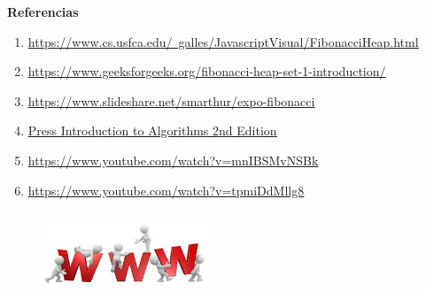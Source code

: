 \documentclass[11pt]{beamer}
\begin{document}
\begin{frame}{\bf \large {}}

{\center \bf \huge \color{red} Referencias \\}

\begin{enumerate}
\item \href{https://www.cs.usfca.edu/~galles/JavascriptVisual/FibonacciHeap.html}{\scriptsize \color{blue} \underline{https://www.cs.usfca.edu/~galles/JavascriptVisual/FibonacciHeap.html}}\\

\item \href{https://www.geeksforgeeks.org/fibonacci-heap-set-1-introduction/}{\scriptsize \color{blue} \underline{https://www.geeksforgeeks.org/fibonacci-heap-set-1-introduction/}}\\

\item \href{https://www.slideshare.net/smarthur/expo-fibonacci}{\scriptsize \color{blue} \underline{https://www.slideshare.net/smarthur/expo-fibonacci}}\\

\item \href{http://web.karabuk.edu.tr/hakankutucu/CME222/MIT[1].Press.Introduction.to.Algorithms.2nd.Edition.eBook-TLFeBOOK.pdf}{\scriptsize \color{blue} \underline{Press Introduction to Algorithms 2nd Edition}}\\

\item \href{https://www.youtube.com/watch?v=mnIBSMvNSBk}{\scriptsize \color{blue} \underline{https://www.youtube.com/watch?v=mnIBSMvNSBk}}\\

\item \href{https://www.youtube.com/watch?v=tpmiDdMllg8}{\scriptsize \color{blue} \underline{https://www.youtube.com/watch?v=tpmiDdMllg8}}\\
	
\end{enumerate}

\begin{figure}[center]
  \includegraphics[width=5cm, height=2.5cm]{Img/Referencias.jpg}
\end{figure}	
\end{frame}
\end{document}
